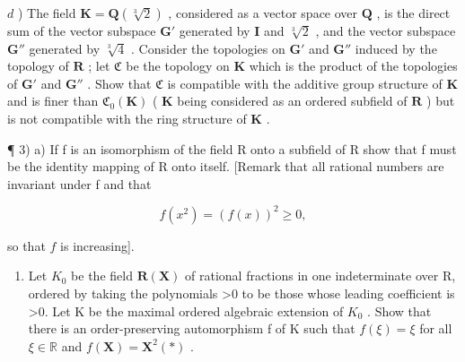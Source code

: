 \(d\) ) The field \(\mathbf{K} = \mathbf{Q}(\sqrt[3]{2})\) , considered as a vector space over \(\mathbf{Q}\) , is the direct sum of the vector subspace \(\mathbf{G}'\) generated by \(\mathbf{I}\) and \(\sqrt[3]{2}\) , and the vector subspace \(\mathbf{G}''\) generated by \(\sqrt[3]{4}\) . Consider the topologies on \(\mathbf{G}'\) and \(\mathbf{G}''\) induced by the topology of \(\mathbf{R}\) ; let \(\mathfrak{C}\) be the topology on \(\mathbf{K}\) which is the product of the topologies of \(\mathbf{G}'\) and \(\mathbf{G}''\) . Show that \(\mathfrak{C}\) is compatible with the additive group structure of \(\mathbf{K}\) and is finer than \(\mathfrak{C}_0(\mathbf{K})\) ( \(\mathbf{K}\) being considered as an ordered subfield of \(\mathbf{R}\) ) but is not compatible with the ring structure of \(\mathbf{K}\) .

¶ 3) a) If f is an isomorphism of the field R onto a subfield of R show that f must be the identity mapping of R onto itself. {[}Remark that all rational numbers are invariant under f and that

\[
f (x ^ {2}) = (f (x)) ^ {2} \geqslant 0,
\]

so that \(f\) is increasing{]}.

\begin{enumerate}
\def\labelenumi{\alph{enumi})}
\setcounter{enumi}{1}
\tightlist
\item
  Let \(K_{0}\) be the field \(\mathbf{R}(\mathbf{X})\) of rational fractions in one indeterminate over R, ordered by taking the polynomials \textgreater0 to be those whose leading coefficient is \textgreater0. Let K be the maximal ordered algebraic extension of \(K_{0}\) . Show that there is an order-preserving automorphism f of K such that \(f(\xi)=\xi\) for all \(\xi\in\mathbb{R}\) and \(f(\mathbf{X})=\mathbf{X}^{2}(*)\) .
\end{enumerate}


